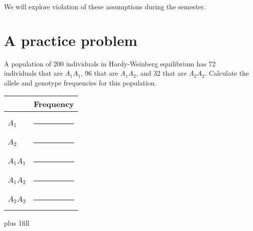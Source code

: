 \documentclass[letterpaper]{tufte-handout}
\begin{document}
We will explore violation of these assumptions during the semester.

\section*{A practice problem}

\noindent A population of 200 individuals in Hardy-Weinberg equilibrium
has 72 individuals that are $A_1A_1$, 96 that are $A_1A_2$, and 32 
that are $A_2A_2$. Calculate the allele and genotype frequencies 
for this population.

\bigskip

\begin{tabular}{@{}ll@{}}
	\toprule
	& Frequency\tabularnewline
	\midrule
	& \tabularnewline
	$A_1$		&	\rule{0.6in}{0.4pt}\tabularnewline[2em]
	$A_2$		&	\rule{0.6in}{0.4pt}\tabularnewline[2em]
	$A_1A_1$	&	\rule{0.6in}{0.4pt}\tabularnewline[2em]
	$A_1A_2$	&	\rule{0.6in}{0.4pt}\tabularnewline[2em]
	$A_2A_2$	&	\rule{0.6in}{0.4pt}\tabularnewline
	\bottomrule
\end{tabular}


\vskip0pt plus 1fill


\begin{margintable}
\hfill {}
\end{margintable}
\end{document}
